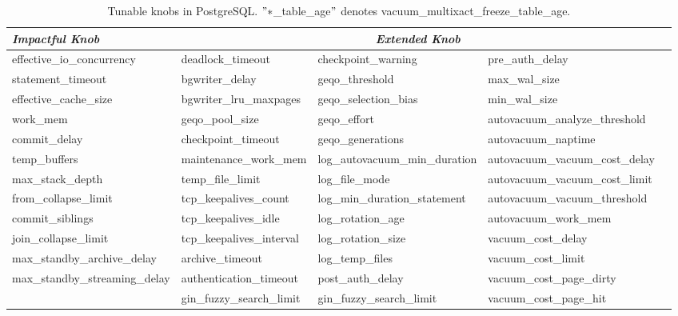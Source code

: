 \begin{table*}[hb]
\centering
\vspace{-1.5em}
\caption{Tunable knobs in PostgreSQL. $"*$\_table\_age$"$ denotes vacuum\_multixact\_freeze\_table\_age.}
\label{tbl:knob}
{
\begin{tabular}{lllll}\hline
\textbf{\textit{Impactful Knob}}  & \multicolumn{3}{c}{\textbf{\textit{Extended Knob}}}                                                                                                    \\\hline
effective\_io\_concurrency     & deadlock\_timeout         & checkpoint\_warning            & pre\_auth\_delay                \\
statement\_timeout             & bgwriter\_delay           & geqo\_threshold                & max\_wal\_size                  \\
effective\_cache\_size         & bgwriter\_lru\_maxpages   & geqo\_selection\_bias          & min\_wal\_size                  \\
work\_mem                      & geqo\_pool\_size          & geqo\_effort                   & autovacuum\_analyze\_threshold  \\
commit\_delay                  & checkpoint\_timeout       & geqo\_generations              & autovacuum\_naptime             \\
temp\_buffers                  & maintenance\_work\_mem    & log\_autovacuum\_min\_duration & autovacuum\_vacuum\_cost\_delay \\
max\_stack\_depth              & temp\_file\_limit         & log\_file\_mode                & autovacuum\_vacuum\_cost\_limit \\
from\_collapse\_limit          & tcp\_keepalives\_count    & log\_min\_duration\_statement  & autovacuum\_vacuum\_threshold   \\
commit\_siblings               & tcp\_keepalives\_idle     & log\_rotation\_age             & autovacuum\_work\_mem           \\
join\_collapse\_limit          & tcp\_keepalives\_interval & log\_rotation\_size            & vacuum\_cost\_delay             \\
max\_standby\_archive\_delay   & archive\_timeout          & log\_temp\_files               & vacuum\_cost\_limit             \\
max\_standby\_streaming\_delay & authentication\_timeout   & post\_auth\_delay              & vacuum\_cost\_page\_dirty       \\
                               & gin\_fuzzy\_search\_limit & gin\_fuzzy\_search\_limit      & vacuum\_cost\_page\_hit         \\

\end{tabular}}
\end{table*}
